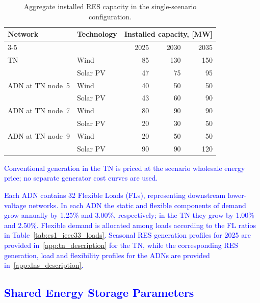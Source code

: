 \documentclass[preprint,12pt]{elsarticle}
\begin{document}
\begin{table}[htbp!]
    \centering
    \caption{Aggregate installed RES capacity in the
    single-scenario configuration.}
    \label{tab:res_capacity_summary}
    \begin{tabular}{@{}llrrr@{}}
        \toprule
        Network & Technology & \multicolumn{3}{c}{Installed capacity, [MW]} \\
        \cmidrule(lr){3-5}
        & & 2025 & 2030 & 2035 \\
        \midrule
        TN & Wind     & 85 & 130 & 150 \\
           & Solar PV & 47 & 75  & 95  \\
        \midrule
        ADN at TN node~5 & Wind     & 40 & 50 & 50 \\
                         & Solar PV & 43 & 60 & 90 \\
        \midrule
        ADN at TN node~7 & Wind     & 80 & 90 & 90 \\
                         & Solar PV & 20 & 30 & 50 \\
        \midrule
        ADN at TN node~9 & Wind     & 20 & 50 & 50  \\
                         & Solar PV & 90 & 90 & 120 \\
        \bottomrule
    \end{tabular}
\end{table}

\textcolor{blue}{
    Conventional generation in the TN is priced at the scenario wholesale energy price; no separate generator cost curves are used.
}

\textcolor{blue}{
    Each ADN contains 32 Flexible Loads (FLs), representing downstream lower-voltage networks. In each ADN the static and flexible components of demand grow annually by 1.25\% and 3.00\%, respectively; in the TN they grow by 1.00\% and 2.50\%. Flexible demand is allocated among loads according to the FL ratios in Table~\ref{tab:cs1_ieee33_loads}.
    Seasonal RES generation profiles for 2025 are provided in~\ref{app:tn_description} for the TN, while the corresponding RES generation, load and flexibility profiles for the ADNs are provided in~\ref{app:dns_description}.
}

\subsection{\textcolor{blue}{Shared Energy Storage Parameters}}
\label{sec:case_ess_params}
\end{document}
